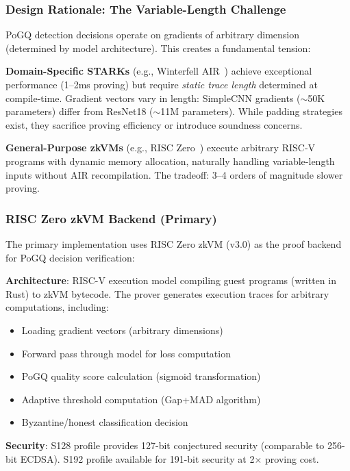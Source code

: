 \subsubsection{Design Rationale: The Variable-Length Challenge}

PoGQ detection decisions operate on gradients of arbitrary dimension (determined by model architecture). This creates a fundamental tension:

\textbf{Domain-Specific STARKs} (e.g., Winterfell AIR~\cite{winterfell}) achieve exceptional performance (1--2ms proving) but require \textit{static trace length} determined at compile-time. Gradient vectors vary in length: SimpleCNN gradients ($\sim$50K parameters) differ from ResNet18 ($\sim$11M parameters). While padding strategies exist, they sacrifice proving efficiency or introduce soundness concerns.

\textbf{General-Purpose zkVMs} (e.g., RISC Zero~\cite{risczero}) execute arbitrary RISC-V programs with dynamic memory allocation, naturally handling variable-length inputs without AIR recompilation. The tradeoff: 3--4 orders of magnitude slower proving.

\subsubsection{RISC Zero zkVM Backend (Primary)}

The primary implementation uses RISC Zero zkVM (v3.0) as the proof backend for PoGQ decision verification:

\textbf{Architecture}: RISC-V execution model compiling guest programs (written in Rust) to zkVM bytecode. The prover generates execution traces for arbitrary computations, including:
\begin{itemize}
    \item Loading gradient vectors (arbitrary dimensions)
    \item Forward pass through model for loss computation
    \item PoGQ quality score calculation (sigmoid transformation)
    \item Adaptive threshold computation (Gap+MAD algorithm)
    \item Byzantine/honest classification decision
\end{itemize}

\textbf{Security}: S128 profile provides 127-bit conjectured security (comparable to 256-bit ECDSA). S192 profile available for 191-bit security at 2$\times$ proving cost.

